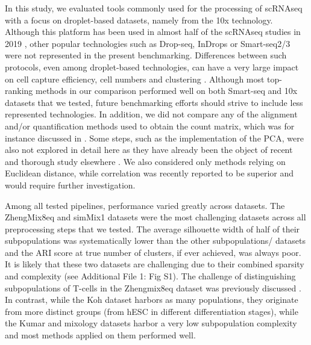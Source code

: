\documentclass{bmcart}
\begin{document}
In this study, we evaluated tools commonly used for the processing of scRNAseq with a focus on droplet-based datasets, namely from the 10x technology. Although this platform has been used in almost half of the scRNAseq studies in 2019 \cite{SvenssonDB2019}, other popular technologies such as Drop-seq, InDrops or Smart-seq2/3 were not represented in the present benchmarking. Differences between such protocols, even among droplet-based technologies, can have a very large impact on cell capture efficiency, cell numbers and clustering \cite{MereuCellAtlas2019, ZhangDroplet2019, SalomonDroplet2019}. Although most top-ranking methods in our comparison performed well on both Smart-seq and 10x datasets that we tested, future benchmarking efforts should strive to include less represented technologies. In addition, we did not compare any of the alignment and/or quantification methods used to obtain the count matrix, which was for instance discussed in \cite{viethSystematic2019}. Some steps, such as the implementation of the PCA, were also not explored in detail here as they have already been the object of recent and thorough study elsewhere \cite{SunDimRed2019, TsuyuzakiPCA2020}. We also considered only methods relying on Euclidean distance, while correlation was recently reported to be superior \cite{kim_impact_2019} and would require further investigation.

Among all tested pipelines, performance varied greatly across datasets. The ZhengMix8eq and simMix1 datasets were the most challenging datasets across all preprocessing steps that we tested. The average silhouette width of half of their subpopulations was systematically lower than the other subpopulations/ datasets and the ARI score at true number of clusters, if ever achieved, was always poor. It is likely that these two datasets are challenging due to their combined sparsity and complexity (see Additional File 1: Fig S1). The challenge of distinguishing subpopulations of T-cells in the Zhengmix8eq dataset was previously discussed \cite{duoClustering2018}. In contrast, while the Koh dataset harbors as many populations, they originate from more distinct groups (from hESC in different differentiation stages), while the Kumar and mixology datasets harbor a very low subpopulation complexity and most methods applied on them performed well.
\end{document}
